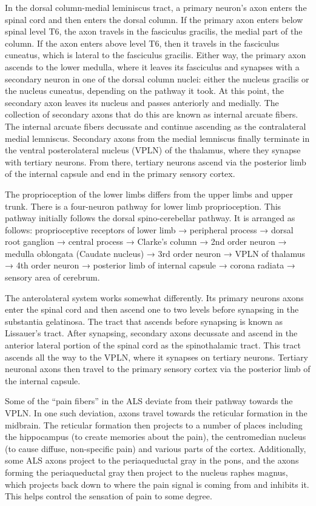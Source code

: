 In the dorsal column-medial leminiscus tract, a primary neuron's axon enters the spinal cord and then enters the dorsal column. If the primary axon enters below spinal level T6, the axon travels in the fasciculus gracilis, the medial part of the column. If the axon enters above level T6, then it travels in the fasciculus cuneatus, which is lateral to the fasciculus gracilis. Either way, the primary axon ascends to the lower medulla, where it leaves its fasciculus and synapses with a secondary neuron in one of the dorsal column nuclei: either the nucleus gracilis or the nucleus cuneatus, depending on the pathway it took. At this point, the secondary axon leaves its nucleus and passes anteriorly and medially. The collection of secondary axons that do this are known as internal arcuate fibers. The internal arcuate fibers decussate and continue ascending as the contralateral medial lemniscus. Secondary axons from the medial lemniscus finally terminate in the ventral posterolateral nucleus (VPLN) of the thalamus, where they synapse with tertiary neurons. From there, tertiary neurons ascend via the posterior limb of the internal capsule and end in the primary sensory cortex.

The proprioception of the lower limbs differs from the upper limbs and upper trunk. There is a four-neuron pathway for lower limb proprioception. This pathway initially follows the dorsal spino-cerebellar pathway. It is arranged as follows: proprioceptive receptors of lower limb → peripheral process → dorsal root ganglion → central process → Clarke's column → 2nd order neuron → medulla oblongata (Caudate nucleus) → 3rd order neuron → VPLN of thalamus → 4th order neuron → posterior limb of internal capsule → corona radiata → sensory area of cerebrum.

The anterolateral system works somewhat differently. Its primary neurons axons enter the spinal cord and then ascend one to two levels before synapsing in the substantia gelatinosa. The tract that ascends before synapsing is known as Lissauer's tract. After synapsing, secondary axons decussate and ascend in the anterior lateral portion of the spinal cord as the spinothalamic tract. This tract ascends all the way to the VPLN, where it synapses on tertiary neurons. Tertiary neuronal axons then travel to the primary sensory cortex via the posterior limb of the internal capsule.

Some of the ``pain fibers'' in the ALS deviate from their pathway towards the VPLN. In one such deviation, axons travel towards the reticular formation in the midbrain. The reticular formation then projects to a number of places including the hippocampus (to create memories about the pain), the centromedian nucleus (to cause diffuse, non-specific pain) and various parts of the cortex. Additionally, some ALS axons project to the periaqueductal gray in the pons, and the axons forming the periaqueductal gray then project to the nucleus raphes magnus, which projects back down to where the pain signal is coming from and inhibits it. This helps control the sensation of pain to some degree.

